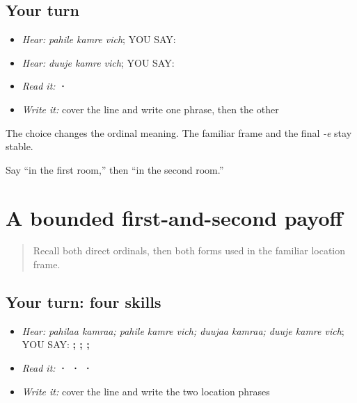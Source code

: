 \subsection*{Your turn}
\begin{itemize}
\raggedright
  \item \emph{Hear:} \emph{pahile kamre vich}; YOU SAY: \textbf{  }
  \item \emph{Hear:} \emph{duuje kamre vich}; YOU SAY: \textbf{  }
  \item \emph{Read it:} \textbf{   ·   }
  \item \emph{Write it:} cover the line and write one phrase, then the other
\end{itemize}

\begin{grammarlens}[title={Grammar Lens}]
The choice changes the ordinal meaning. The familiar \textbf{ } frame and the final \emph{-e} stay stable.
\end{grammarlens}

\begin{tcolorbox}[breakable,colback=teal!4,colframe=teal!35!black,title={Before you move on}]
Say “in the first room,” then “in the second room.”
\end{tcolorbox}
\section[\texorpdfstring{\pa{ਪਹਿਲਾ} \pa{ਕਮਰਾ} … (pahilaa kamraa …)}{ਪਹਿਲਾ ਕਮਰਾ … (pahilaa kamraa …)}]{A bounded first-and-second payoff}

\label{lesson:PA-C193-payoff}



\begin{quote}
Recall both direct ordinals, then both forms used in the familiar location frame.
\end{quote}

\subsection*{Your turn: four skills}
\begin{itemize}
\raggedright
  \item \emph{Hear:} \emph{pahilaa kamraa; pahile kamre vich; duujaa kamraa; duuje kamre vich}; YOU SAY: \textbf{ ;   ;  ;   }
  \item \emph{Read it:} \textbf{  ·    ·   ·   }
  \item \emph{Write it:} cover the line and write the two location phrases
\end{itemize}

